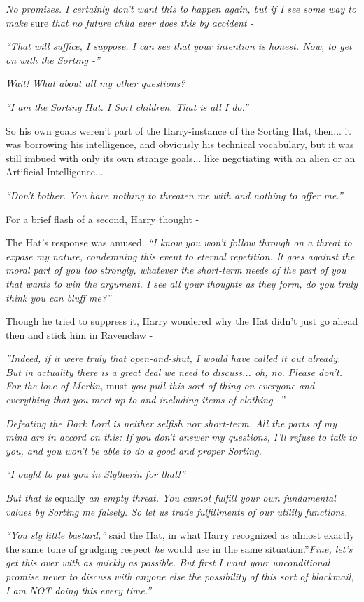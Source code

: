 \emph{No promises. I certainly don't want this to happen again, but if I
see some way to make} sure \emph{that no future child ever does this by
accident -}

\emph{``That will suffice, I suppose. I can see that your intention is
honest. Now, to get on with the Sorting -''}

\emph{Wait! What about all my other questions?}

\emph{``I am the Sorting Hat. I Sort children. That is all I do.''}

So his own goals weren't part of the Harry-instance of the Sorting Hat,
then... it was borrowing his intelligence, and obviously his
technical vocabulary, but it was still imbued with only its own strange
goals... like negotiating with an alien or an Artificial
Intelligence...

\emph{``Don't bother. You have nothing to threaten me with and nothing
to offer me.''}

For a brief flash of a second, Harry thought -

The Hat's response was amused. \emph{``I know you won't follow through
on a threat to expose my nature, condemning this event to eternal
repetition. It goes against the moral part of you too strongly, whatever
the short-term needs of the part of you that wants to win the argument.
I see all your thoughts as they form, do you truly think you can bluff
me?''}

Though he tried to suppress it, Harry wondered why the Hat didn't just
go ahead then and stick him in Ravenclaw -

\emph{''Indeed, if it were truly that open-and-shut, I would have called
it out already. But in actuality there is a great deal we need to
discuss... oh, no. Please don't. For the love of Merlin,} must
\emph{you pull this sort of thing on everyone and everything that you
meet up to and including items of clothing -''}

\emph{Defeating the Dark Lord is neither selfish nor short-term. All the
parts of my mind are in accord on this: If you don't answer my
questions, I'll refuse to talk to you, and you won't be able to do a
good and proper Sorting.}

\emph{``I ought to put you in Slytherin for that!''}

\emph{But that is} equally \emph{an empty threat. You cannot fulfill
your own fundamental values by Sorting me falsely. So let us trade
fulfillments of our utility functions.}

\emph{``You sly little bastard,''} said the Hat, in what Harry
recognized as almost exactly the same tone of grudging respect \emph{he}
would use in the same situation.''\emph{Fine, let's get this over with
as quickly as possible. But first I want your unconditional promise
never to discuss with anyone else the possibility of this sort of
blackmail, I am NOT doing this every time.''}

